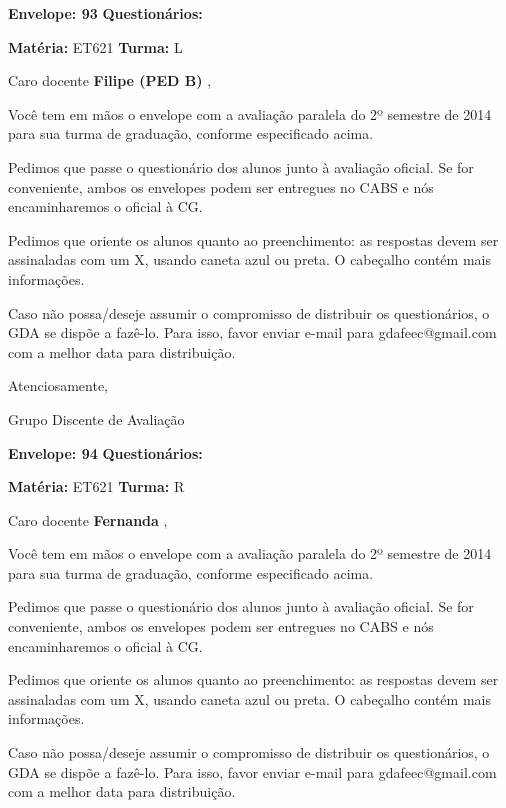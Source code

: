 \documentclass[a5paper]{letter}
\begin{document}
\vspace{0.5cm}

{\bf Envelope: 93 }		\hfill	{\bf Questionários:} \hspace{2cm}

\newpage
\thispagestyle{empty}

\hfill {\bf Matéria:} ET621 {\bf Turma:} L

Caro docente {\bf Filipe (PED B) }, 

	Você tem em mãos o envelope com a avaliação paralela do 2º semestre de 2014 para sua turma de graduação, conforme especificado acima.

	Pedimos que passe o questionário dos alunos junto à avaliação oficial. Se for conveniente, ambos os envelopes podem ser entregues no CABS e nós encaminharemos o oficial à CG.

Pedimos que oriente os alunos quanto ao preenchimento: as respostas devem ser assinaladas com um X, usando caneta azul ou preta. O cabeçalho contém mais informações.

	Caso não possa/deseje assumir o compromisso de distribuir os questionários, o GDA se dispõe a fazê-lo. Para isso, favor enviar e-mail para gdafeec@gmail.com com a melhor data para distribuição.


Atenciosamente, 

Grupo Discente de Avaliação

\vspace{0.5cm}

{\bf Envelope: 94 }		\hfill	{\bf Questionários:} \hspace{2cm}

\newpage
\thispagestyle{empty}

\hfill {\bf Matéria:} ET621 {\bf Turma:} R

Caro docente {\bf Fernanda }, 

	Você tem em mãos o envelope com a avaliação paralela do 2º semestre de 2014 para sua turma de graduação, conforme especificado acima.

	Pedimos que passe o questionário dos alunos junto à avaliação oficial. Se for conveniente, ambos os envelopes podem ser entregues no CABS e nós encaminharemos o oficial à CG.

Pedimos que oriente os alunos quanto ao preenchimento: as respostas devem ser assinaladas com um X, usando caneta azul ou preta. O cabeçalho contém mais informações.

	Caso não possa/deseje assumir o compromisso de distribuir os questionários, o GDA se dispõe a fazê-lo. Para isso, favor enviar e-mail para gdafeec@gmail.com com a melhor data para distribuição.
\end{document}
